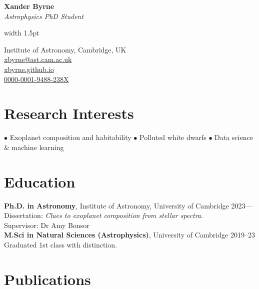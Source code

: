 \documentclass[a4paper,10pt]{article}
\makeatletter
\def\name{Xander Byrne}
\def\position{Astrophysics PhD Student}
\def\email{
    \href{mailto:xbyrne@ast.cam.ac.uk}{xbyrne@ast.cam.ac.uk}
}
\def\website{
    \href{https://xbyrne.github.io}{xbyrne.github.io}
}
\def\address{
    Institute of Astronomy,
    Cambridge, UK
}
\def\orcid{
    \href{https://orcid.org/0000-0001-9488-238X}{0000-0001-9488-238X}
}
\makeatother
\begin{document}
\noindent
\begin{minipage}[t]{0.73\textwidth}
    \vspace{1.2ex} %
    {\fontsize{50}{55}\selectfont \textbf{\name}}\\[0.3em]
    {\fontsize{20.5}{30}\textit{\position}}
\end{minipage}
{\color{highlight}\vrule width 1.5pt}
\begin{minipage}[t]{0.27\textwidth}
\raggedleft
{\fontsize{11}{12}\selectfont
\vspace{.3em}
    \address \faMapMarker* \\[.3em]
    \email \faEnvelope[regular] \\[.1em]
    \website \faGithub \\[.3em]
    \orcid \faOrcid
}
\end{minipage}


\section*{Research Interests}
$\bullet$ Exoplanet composition and habitability
\hspace{1.5em}
$\bullet$ Polluted white dwarfs
\hspace{1.5em}
$\bullet$ Data science \& machine learning

\section*{Education}

\textbf{Ph.D. in Astronomy}, Institute of Astronomy, University of Cambridge \hfill 2023---\\
Dissertation: \textit{Clues to exoplanet composition from stellar spectra}.\\
Supervisor: Dr Amy Bonsor\\

\noindent \textbf{M.Sci in Natural Sciences (Astrophysics)}, University of Cambridge \hfill 2019--23 \\
Graduated 1st class with distinction.



\section*{Publications}
\end{document}
